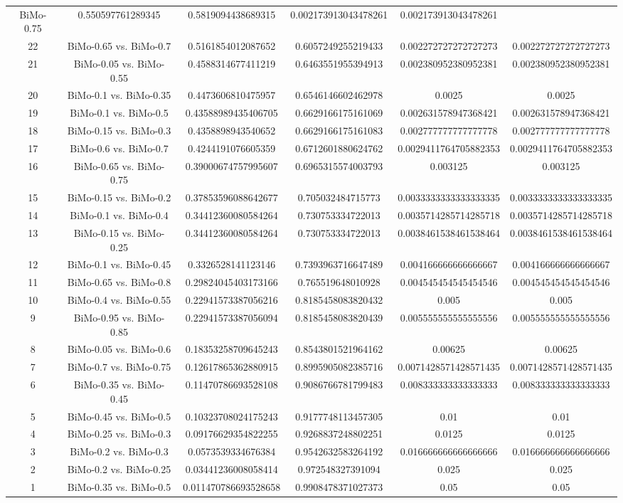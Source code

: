 \documentclass[a4paper,10pt]{article}
\begin{document}
\begin{landscape}
\begin{table}[!htp]
\begin{tabular}{cccccc}
BiMo-0.75&0.550597761289345&0.5819094438689315&0.002173913043478261&0.002173913043478261\\22&BiMo-0.65 vs. BiMo-0.7&0.5161854012087652&0.6057249255219433&0.002272727272727273&0.002272727272727273\\21&BiMo-0.05 vs. BiMo-0.55&0.4588314677411219&0.6463551955394913&0.002380952380952381&0.002380952380952381\\20&BiMo-0.1 vs. BiMo-0.35&0.4473606810475957&0.6546146602462978&0.0025&0.0025\\19&BiMo-0.1 vs. BiMo-0.5&0.43588989435406705&0.6629166175161069&0.002631578947368421&0.002631578947368421\\18&BiMo-0.15 vs. BiMo-0.3&0.4358898943540652&0.6629166175161083&0.002777777777777778&0.002777777777777778\\17&BiMo-0.6 vs. BiMo-0.7&0.4244191076605359&0.6712601880624762&0.0029411764705882353&0.0029411764705882353\\16&BiMo-0.65 vs. BiMo-0.75&0.39000674757995607&0.6965315574003793&0.003125&0.003125\\15&BiMo-0.15 vs. BiMo-0.2&0.37853596088642677&0.705032484715773&0.0033333333333333335&0.0033333333333333335\\14&BiMo-0.1 vs. BiMo-0.4&0.34412360080584264&0.730753334722013&0.0035714285714285718&0.0035714285714285718\\13&BiMo-0.15 vs. BiMo-0.25&0.34412360080584264&0.730753334722013&0.0038461538461538464&0.0038461538461538464\\12&BiMo-0.1 vs. BiMo-0.45&0.3326528141123146&0.7393963716647489&0.004166666666666667&0.004166666666666667\\11&BiMo-0.65 vs. BiMo-0.8&0.29824045403173166&0.765519648010928&0.004545454545454546&0.004545454545454546\\10&BiMo-0.4 vs. BiMo-0.55&0.22941573387056216&0.8185458083820432&0.005&0.005\\9&BiMo-0.95 vs. BiMo-0.85&0.22941573387056094&0.8185458083820439&0.005555555555555556&0.005555555555555556\\8&BiMo-0.05 vs. BiMo-0.6&0.18353258709645243&0.8543801521964162&0.00625&0.00625\\7&BiMo-0.7 vs. BiMo-0.75&0.12617865362880915&0.8995905082385716&0.0071428571428571435&0.0071428571428571435\\6&BiMo-0.35 vs. BiMo-0.45&0.11470786693528108&0.9086766781799483&0.008333333333333333&0.008333333333333333\\5&BiMo-0.45 vs. BiMo-0.5&0.10323708024175243&0.9177748113457305&0.01&0.01\\4&BiMo-0.25 vs. BiMo-0.3&0.09176629354822255&0.9268837248802251&0.0125&0.0125\\3&BiMo-0.2 vs. BiMo-0.3&0.0573539334676384&0.9542632583264192&0.016666666666666666&0.016666666666666666\\2&BiMo-0.2 vs. BiMo-0.25&0.03441236008058414&0.972548327391094&0.025&0.025\\1&BiMo-0.35 vs. BiMo-0.5&0.011470786693528658&0.9908478371027373&0.05&0.05\\\hline

\end{tabular}
\end{table}
\end{landscape}
\end{document}
